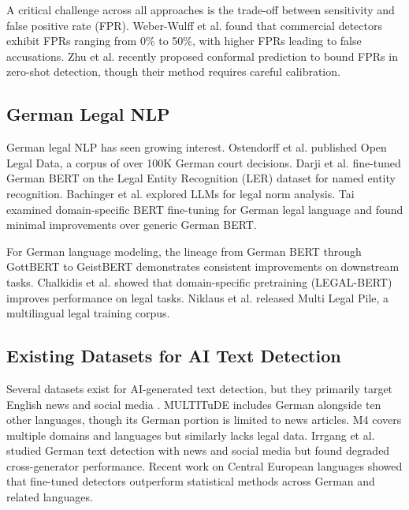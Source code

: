 \documentclass[11pt,a4paper]{article}
\begin{document}
A critical challenge across all approaches is the trade-off between sensitivity and false positive rate (FPR). Weber-Wulff et al. \cite{weber2023testing} found that commercial detectors exhibit FPRs ranging from 0\% to 50\%, with higher FPRs leading to false accusations. Zhu et al. \cite{zhu2025reliably} recently proposed conformal prediction to bound FPRs in zero-shot detection, though their method requires careful calibration.

\subsection{German Legal NLP}

German legal NLP has seen growing interest. Ostendorff et al. \cite{ostendorff2020openlegal} published Open Legal Data, a corpus of over 100K German court decisions. Darji et al. \cite{darji2023german} fine-tuned German BERT on the Legal Entity Recognition (LER) dataset \cite{leitner2020ler} for named entity recognition. Bachinger et al. \cite{bachinger2024extracting} explored LLMs for legal norm analysis. Tai \cite{tai2019german} examined domain-specific BERT fine-tuning for German legal language and found minimal improvements over generic German BERT.

For German language modeling, the lineage from German BERT \cite{chan2020german} through GottBERT \cite{scheible2024gottbert} to GeistBERT \cite{scheible2025geistbert} demonstrates consistent improvements on downstream tasks. Chalkidis et al. \cite{chalkidis2020legal} showed that domain-specific pretraining (LEGAL-BERT) improves performance on legal tasks. Niklaus et al. \cite{niklaus2023multilegal} released Multi Legal Pile, a multilingual legal training corpus.

\subsection{Existing Datasets for AI Text Detection}

Several datasets exist for AI-generated text detection, but they primarily target English news and social media \cite{uchendu2021turingbench, guo2023hc3}. MULTITuDE \cite{macko2023multitude} includes German alongside ten other languages, though its German portion is limited to news articles. M4 \cite{wang2024m4} covers multiple domains and languages but similarly lacks legal data. Irrgang et al. \cite{irrgang2024features} studied German text detection with news and social media but found degraded cross-generator performance. Recent work on Central European languages \cite{macko2025central} showed that fine-tuned detectors outperform statistical methods across German and related languages.
\end{document}

